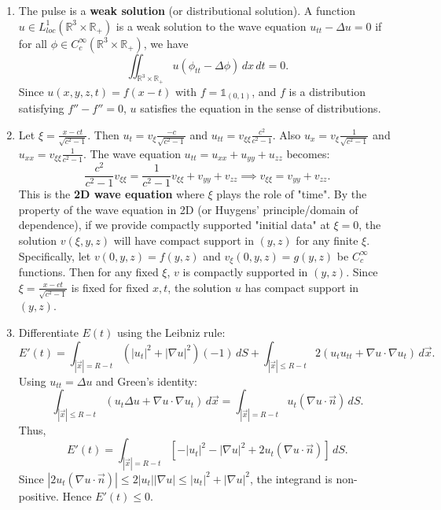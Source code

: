 \begin{solution}
\begin{enumerate}
    \item[(a)] The pulse is a \textbf{weak solution} (or distributional solution). A function $u \in L^1_{loc}(\mathbb{R}^3 \times \mathbb{R}_+)$ is a weak solution to the wave equation $u_{tt} - \Delta u = 0$ if for all $\phi \in C_c^\infty(\mathbb{R}^3 \times \mathbb{R}_+)$, we have
    \[
    \iint_{\mathbb{R}^3 \times \mathbb{R}_+} u (\phi_{tt} - \Delta \phi) \, dx \, dt = 0.
    \]
    Since $u(x,y,z,t) = f(x-t)$ with $f = \mathbb{1}_{(0,1)}$, and $f$ is a distribution satisfying $f'' - f'' = 0$, $u$ satisfies the equation in the sense of distributions.
    
    \item[(b)] Let $\xi = \frac{x-ct}{\sqrt{c^2-1}}$. Then $u_t = v_\xi \frac{-c}{\sqrt{c^2-1}}$ and $u_{tt} = v_{\xi\xi} \frac{c^2}{c^2-1}$.
    Also $u_x = v_\xi \frac{1}{\sqrt{c^2-1}}$ and $u_{xx} = v_{\xi\xi} \frac{1}{c^2-1}$.
    The wave equation $u_{tt} = u_{xx} + u_{yy} + u_{zz}$ becomes:
    \[
    \frac{c^2}{c^2-1} v_{\xi\xi} = \frac{1}{c^2-1} v_{\xi\xi} + v_{yy} + v_{zz} \implies v_{\xi\xi} = v_{yy} + v_{zz}.
    \]
    This is the \textbf{2D wave equation} where $\xi$ plays the role of "time". By the property of the wave equation in 2D (or Huygens' principle/domain of dependence), if we provide compactly supported "initial data" at $\xi=0$, the solution $v(\xi, y, z)$ will have compact support in $(y,z)$ for any finite $\xi$. Specifically, let $v(0, y, z) = f(y, z)$ and $v_\xi(0, y, z) = g(y, z)$ be $C_c^\infty$ functions. Then for any fixed $\xi$, $v$ is compactly supported in $(y,z)$. Since $\xi = \frac{x-ct}{\sqrt{c^2-1}}$ is fixed for fixed $x,t$, the solution $u$ has compact support in $(y,z)$.
    
    \item[(c)] Differentiate $E(t)$ using the Leibniz rule:
    \[
    E'(t) = \int_{|\vec{x}|=R-t} (|u_t|^2 + |\nabla u|^2) (-1) \, dS + \int_{|\vec{x}| \le R-t} 2(u_t u_{tt} + \nabla u \cdot \nabla u_t) \, d\vec{x}.
    \]
    Using $u_{tt} = \Delta u$ and Green's identity:
    \[
    \int_{|\vec{x}| \le R-t} (u_t \Delta u + \nabla u \cdot \nabla u_t) \, d\vec{x} = \int_{|\vec{x}| = R-t} u_t (\nabla u \cdot \vec{n}) \, dS.
    \]
    Thus,
    \[
    E'(t) = \int_{|\vec{x}|=R-t} \left[ -|u_t|^2 - |\nabla u|^2 + 2 u_t (\nabla u \cdot \vec{n}) \right] \, dS.
    \]
    Since $|2 u_t (\nabla u \cdot \vec{n})| \le 2 |u_t| |\nabla u| \le |u_t|^2 + |\nabla u|^2$, the integrand is non-positive. Hence $E'(t) \le 0$.
    

\end{enumerate}
\end{solution}
